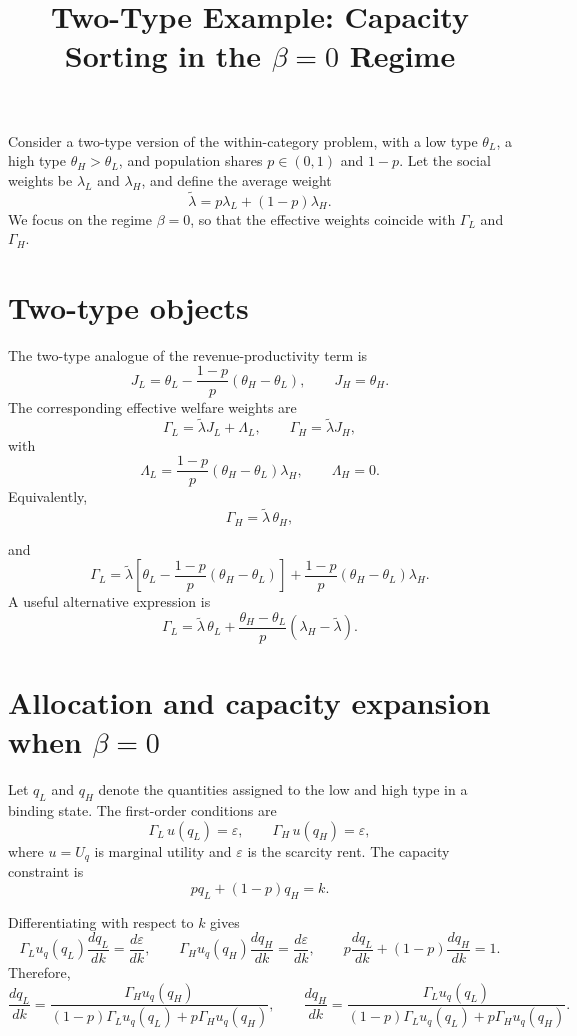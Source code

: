 \documentclass[11pt]{article}
\title{Two-Type Example: Capacity Sorting in the $\beta=0$ Regime}
\date{}
\begin{document}
\maketitle

Consider a two-type version of the within-category problem, with a low type $\theta_L$, a high type $\theta_H>\theta_L$, and population shares $p\in(0,1)$ and $1-p$. Let the social weights be $\lambda_L$ and $\lambda_H$, and define the average weight
\[
\tilde{\lambda}=p\lambda_L+(1-p)\lambda_H.
\]
We focus on the regime $\beta=0$, so that the effective weights coincide with $\Gamma_L$ and $\Gamma_H$.

\section{Two-type objects}

The two-type analogue of the revenue-productivity term is
\[
J_L=\theta_L-\frac{1-p}{p}\left(\theta_H-\theta_L\right),
\qquad
J_H=\theta_H.
\]
The corresponding effective welfare weights are
\[
\Gamma_L=\tilde{\lambda}J_L+\Lambda_L,
\qquad
\Gamma_H=\tilde{\lambda}J_H,
\]
with
\[
\Lambda_L=\frac{1-p}{p}\left(\theta_H-\theta_L\right)\lambda_H,
\qquad
\Lambda_H=0.
\]
Equivalently,
\[
\Gamma_H=\tilde{\lambda}\,\theta_H,
\]

and
\[
\Gamma_L
=
\tilde{\lambda}\left[\theta_L-\frac{1-p}{p}\left(\theta_H-\theta_L\right)\right]
+
\frac{1-p}{p}\left(\theta_H-\theta_L\right)\lambda_H.
\]
A useful alternative expression is
\[
\Gamma_L
=
\tilde{\lambda}\,\theta_L
+
\frac{\theta_H-\theta_L}{p}\left(\lambda_H-\tilde{\lambda}\right).
\]

\section{Allocation and capacity expansion when $\beta=0$}

Let $q_L$ and $q_H$ denote the quantities assigned to the low and high type in a binding state. The first-order conditions are
\[
\Gamma_L\,u(q_L)=\varepsilon,
\qquad
\Gamma_H\,u(q_H)=\varepsilon,
\]
where $u=U_q$ is marginal utility and $\varepsilon$ is the scarcity rent. The capacity constraint is
\[
pq_L+(1-p)q_H=k.
\]

Differentiating with respect to $k$ gives
\[
\Gamma_Lu_q(q_L)\frac{dq_L}{dk}=\frac{d\varepsilon}{dk},
\qquad
\Gamma_Hu_q(q_H)\frac{dq_H}{dk}=\frac{d\varepsilon}{dk},
\qquad
p\frac{dq_L}{dk}+(1-p)\frac{dq_H}{dk}=1.
\]
Therefore,
\[
\frac{dq_L}{dk}
=
\frac{\Gamma_Hu_q(q_H)}{(1-p)\Gamma_Lu_q(q_L)+p\Gamma_Hu_q(q_H)},
\qquad
\frac{dq_H}{dk}
=
\frac{\Gamma_Lu_q(q_L)}{(1-p)\Gamma_Lu_q(q_L)+p\Gamma_Hu_q(q_H)}.
\]
\end{document}
